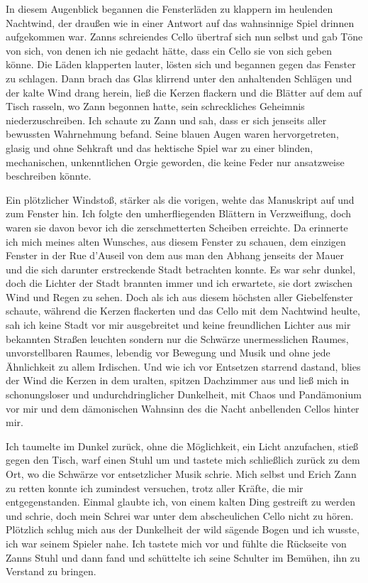 \documentclass[a4paper]{memoir}
\begin{document}
In diesem Augenblick begannen die Fensterläden zu klappern im heulenden Nachtwind, der draußen wie in einer Antwort auf das wahnsinnige Spiel drinnen aufgekommen war. Zanns schreiendes Cello übertraf sich nun selbst und gab Töne von sich, von denen ich nie gedacht hätte, dass ein Cello sie von sich geben könne. Die Läden klapperten lauter, lösten sich und begannen gegen das Fenster zu schlagen. Dann brach das Glas klirrend unter den anhaltenden Schlägen und der kalte Wind drang herein, ließ die Kerzen flackern und die Blätter auf dem auf Tisch rasseln, wo Zann begonnen hatte, sein schreckliches Geheimnis niederzuschreiben. Ich schaute zu Zann und sah, dass er sich jenseits aller bewussten Wahrnehmung befand. Seine blauen Augen waren hervorgetreten, glasig und ohne Sehkraft und das hektische Spiel war zu einer blinden, mechanischen, unkenntlichen Orgie geworden, die keine Feder nur ansatzweise beschreiben könnte.

Ein plötzlicher Windstoß, stärker als die vorigen, wehte das Manuskript auf und zum Fenster hin. Ich folgte den umherfliegenden Blättern in Verzweiflung, doch waren sie davon bevor ich die zerschmetterten Scheiben erreichte. Da erinnerte ich mich meines alten Wunsches, aus diesem Fenster zu schauen, dem einzigen Fenster in der Rue d'Auseil von dem aus man den Abhang jenseits der Mauer und die sich darunter erstreckende Stadt betrachten konnte. Es war sehr dunkel, doch die Lichter der Stadt brannten immer und ich erwartete, sie dort zwischen Wind und Regen zu sehen. Doch als ich aus diesem höchsten aller Giebelfenster schaute, während die Kerzen flackerten und das Cello mit dem Nachtwind heulte, sah ich keine Stadt vor mir ausgebreitet und keine freundlichen Lichter aus mir bekannten Straßen leuchten sondern nur die Schwärze unermesslichen Raumes, unvorstellbaren Raumes, lebendig vor Bewegung und Musik und ohne jede Ähnlichkeit zu allem Irdischen. Und wie ich vor Entsetzen starrend dastand, blies der Wind die Kerzen in dem uralten, spitzen Dachzimmer aus und ließ mich in schonungsloser und undurchdringlicher Dunkelheit, mit Chaos und Pandämonium vor mir und dem dämonischen Wahnsinn des die Nacht anbellenden Cellos hinter mir.

Ich taumelte im Dunkel zurück, ohne die Möglichkeit, ein Licht anzufachen, stieß gegen den Tisch, warf einen Stuhl um und tastete mich schließlich zurück zu dem Ort, wo die Schwärze vor entsetzlicher Musik schrie. Mich selbst und Erich Zann zu retten konnte ich zumindest versuchen, trotz aller Kräfte, die mir entgegenstanden. Einmal glaubte ich, von einem kalten Ding gestreift zu werden und schrie, doch mein Schrei war unter dem abscheulichen Cello nicht zu hören. Plötzlich schlug mich aus der Dunkelheit der wild sägende Bogen und ich wusste, ich war seinem Spieler nahe. Ich tastete mich vor und fühlte die Rückseite von Zanns Stuhl und dann fand und schüttelte ich seine Schulter im Bemühen, ihn zu Verstand zu bringen.
\end{document}
